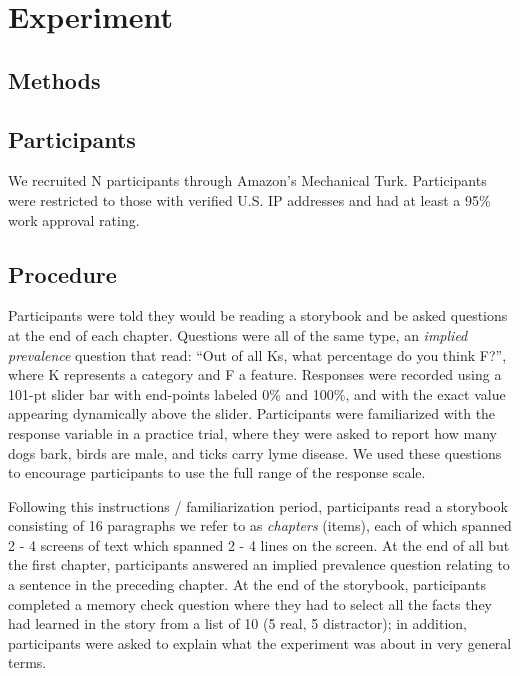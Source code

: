 \documentclass[10pt,letterpaper]{article}
\begin{document}
\section{Experiment}

\subsection{Methods}

\subsection{Participants}
We recruited N participants through Amazon's Mechanical Turk.
Participants were restricted to those with verified U.S. IP addresses and had at least a 95\% work approval rating. 

\subsection{Procedure}
Participants were told they would be reading a storybook and be asked questions at the end of each chapter. 
Questions were all of the same type, an \emph{implied prevalence} question \cite{Gelman2003, Cimpian2010} that read: ``Out of all Ks, what percentage do you think F?'', where K represents a category and F a feature. 
Responses were recorded using a 101-pt slider bar with end-points labeled 0\% and 100\%, and with the exact value appearing dynamically above the slider. 
Participants were familiarized with the response variable in a practice trial, where they were asked to report how many dogs bark, birds are male, and ticks carry lyme disease. 
We used these questions to encourage participants to use the full range of the response scale. 

Following this instructions / familiarization period, participants read a storybook consisting of 16 paragraphs we refer to as \emph{chapters} (items), each of which spanned 2 - 4 screens of text which spanned 2 - 4 lines on the screen. 
At the end of all but the first chapter, participants answered an implied prevalence question relating to a sentence in the preceding chapter. 
At the end of the storybook, participants completed a memory check question where they had to select all the facts they had learned in the story from a list of 10 (5 real, 5 distractor); in addition, participants were asked to explain what the experiment was about in very general terms.
\end{document}
